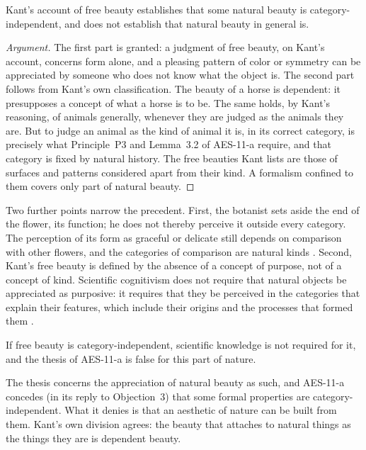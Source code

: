 \documentclass{situationist-preprint}
\begin{document}
\begin{proposition}\label{p:free}
Kant's account of free beauty establishes that some natural beauty is category-independent, and does not establish that natural beauty in general is.
\end{proposition}

\begin{proof}[Argument]
The first part is granted: a judgment of free beauty, on Kant's account, concerns form alone, and a pleasing pattern of color or symmetry can be appreciated by someone who does not know what the object is. The second part follows from Kant's own classification. The beauty of a horse is dependent: it presupposes a concept of what a horse is to be. The same holds, by Kant's reasoning, of animals generally, whenever they are judged as the animals they are. But to judge an animal as the kind of animal it is, in its correct category, is precisely what Principle~P3 and Lemma~3.2 of AES-11-a require, and that category is fixed by natural history. The free beauties Kant lists are those of surfaces and patterns considered apart from their kind. A formalism confined to them covers only part of natural beauty.
\end{proof}

Two further points narrow the precedent. First, the botanist sets aside the end of the flower, its function; he does not thereby perceive it outside every category. The perception of its form as graceful or delicate still depends on comparison with other flowers, and the categories of comparison are natural kinds \citep{Walton1970}. Second, Kant's free beauty is defined by the absence of a concept of purpose, not of a concept of kind. Scientific cognitivism does not require that natural objects be appreciated as purposive: it requires that they be perceived in the categories that explain their features, which include their origins and the processes that formed them \citep{Carlson2000,Budd2002}.

\begin{objection}
If free beauty is category-independent, scientific knowledge is not required for it, and the thesis of AES-11-a is false for this part of nature.
\end{objection}

\begin{reply}
The thesis concerns the appreciation of natural beauty as such, and AES-11-a concedes (in its reply to Objection~3) that some formal properties are category-independent. What it denies is that an aesthetic of nature can be built from them. Kant's own division agrees: the beauty that attaches to natural things as the things they are is dependent beauty.
\end{reply}
\end{document}
